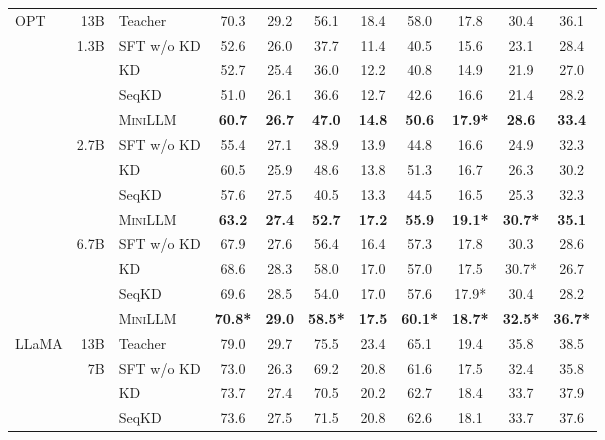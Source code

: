 \documentclass{article}
\begin{document}
\begin{table}[t]
\begin{tabular}{lrl|cc|cc|cc|c|c}
     \multirow{13}{*}{OPT} 
     & 13B & Teacher  &  70.3  &  29.2 &  56.1 &   18.4 &  58.0 & 17.8 & 30.4 & 36.1   \\ \cmidrule(l){2-11}
     & \multirow{4}{*}{1.3B}
        & SFT w/o KD     &  52.6  &  26.0 &  37.7 &   11.4 &  40.5 & 15.6 & 23.1 & 28.4  \\
     &  & KD &  52.7  &  25.4 &  36.0 &   12.2 &  40.8 & 14.9 & 21.9 & 27.0  \\
     &  & SeqKD  &  51.0  &  26.1 &  36.6 &   12.7 &  42.6 & 16.6 & 21.4 & 28.2  \\
     &  & \textsc{MiniLLM}  &  \textbf{60.7}  &  \textbf{26.7} &  \textbf{47.0} &   \textbf{14.8} &  \textbf{50.6} & \textbf{17.9*} & \textbf{28.6} & \textbf{33.4}   \\ \cmidrule(l){2-11}
     & \multirow{4}{*}{2.7B} 
        & SFT w/o KD     &  55.4  &  27.1 &  38.9 &   13.9 &  44.8 & 16.6 & 24.9 & 32.3    \\
     &  & KD &  60.5  &  25.9 &  48.6 &   13.8 &  51.3 & 16.7 & 26.3 & 30.2  \\
     &  & SeqKD  &  57.6  &  27.5 &  40.5 &   13.3 &  44.5 & 16.5 & 25.3 & 32.3    \\
     &  & \textsc{MiniLLM}  &  \textbf{63.2}  &  \textbf{27.4} &  \textbf{52.7} &   \textbf{17.2} &  \textbf{55.9} & \textbf{19.1*} & \textbf{30.7*} & \textbf{35.1}  \\ \cmidrule(l){2-11}
     & \multirow{4}{*}{6.7B} 
        & SFT w/o KD     &  67.9  &  27.6 &  56.4 &  16.4 &   57.3 &  17.8 & 30.3 & 28.6    \\ 
     &  & KD &  68.6  &  28.3 &  58.0 &  17.0 &   57.0 &  17.5 & 30.7* & 26.7    \\
     &  & SeqKD  &  69.6  &  28.5 &  54.0 &  17.0 &   57.6 &  17.9* & 30.4 & 28.2    \\
     &  & \textsc{MiniLLM}  &  \textbf{70.8*}  &  \textbf{29.0} &  \textbf{58.5*} &  \textbf{17.5} &   \textbf{60.1*} &  \textbf{18.7*} & \textbf{32.5*} & \textbf{36.7*}    \\ \midrule
     \multirow{5}{*}{LLaMA}
     & 13B & Teacher  & 79.0   &  29.7 &  75.5 &   23.4 &  65.1 & 19.4 & 35.8 & 38.5    \\ \cmidrule(l){2-11}
     & \multirow{4}{*}{7B}
        & SFT w/o KD     & 73.0   &  26.3 &  69.2 &   20.8 &  61.6 & 17.5 & 32.4 & 35.8   \\
     &  & KD & 73.7   &  27.4 &  70.5 &   20.2 &  62.7 & 18.4 & 33.7 & 37.9   \\
     &  & SeqKD  & 73.6   &  27.5 &  71.5 &   20.8 &  62.6 & 18.1 & 33.7 & 37.6    \\

\end{tabular}
\end{table}
\end{document}
